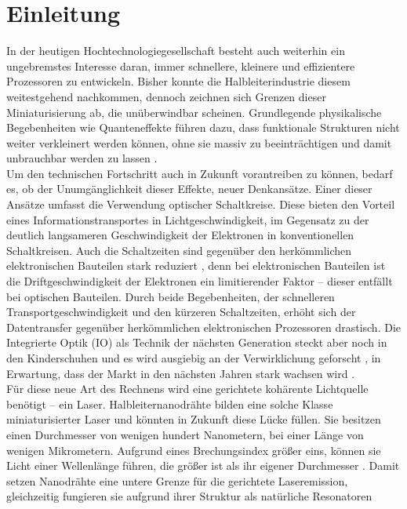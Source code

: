 \chapter{Einleitung} In der heutigen Hochtechnologiegesellschaft besteht auch
weiterhin ein \mbox{ungebremstes} Interesse daran, immer schnellere, kleinere
und effizientere Prozessoren zu \mbox{entwickeln}. Bisher konnte die
Halbleiterindustrie diesem weitestgehend nachkommen, dennoch zeichnen sich
Grenzen dieser Miniaturisierung ab, die unüberwindbar scheinen. Grundlegende
physikalische Begebenheiten wie Quanteneffekte führen dazu, dass funktionale
Strukturen nicht weiter verkleinert werden können, ohne sie massiv zu
beeinträchtigen und damit unbrauchbar werden zu lassen \cite{Moore.2017}.\\  Um
den technischen Fortschritt auch in Zukunft vorantreiben zu können, bedarf es,
ob der Unumgänglichkeit dieser Effekte, neuer Denkansätze. Einer dieser Ansätze
umfasst die Verwendung optischer Schaltkreise. Diese bieten den Vorteil eines
Informationstransportes in Lichtgeschwindigkeit, im Gegensatz zu der deutlich
langsameren \mbox{Geschwindigkeit} der Elektronen in konventionellen
Schaltkreisen. Auch die Schaltzeiten sind gegenüber den herkömmlichen
elektronischen Bauteilen stark reduziert \cite{Simonite.2010,Johnson.2015}, denn
bei elektronischen Bauteilen ist die Driftgeschwindigkeit der Elektronen ein
limitierender Faktor – dieser entfällt bei optischen Bauteilen. Durch beide
\mbox{Begebenheiten}, der schnelleren Transportgeschwindigkeit und den kürzeren
Schaltzeiten, \mbox{erhöht} sich der Datentransfer gegenüber herkömmlichen
elektronischen Prozessoren drastisch. Die Integrierte Optik (IO) als Technik der
nächsten Generation steckt aber noch in den Kinderschuhen und es wird ausgiebig
an der Verwirklichung geforscht \cite{Touch.2017}, in Erwartung, dass der Markt
in den nächsten Jahren stark wachsen wird \cite{Credence.2017}.\\ Für diese neue
Art des Rechnens wird eine gerichtete kohärente Lichtquelle benötigt – ein
Laser. Halbleiternanodrähte bilden eine solche Klasse miniaturisierter Laser und
könnten in Zukunft diese Lücke füllen. Sie besitzen einen Durchmesser von
wenigen hundert Nanometern, bei einer Länge von wenigen Mikrometern. Aufgrund
eines \mbox{Brechungsindex} größer eins, können sie Licht einer Wellenlänge
führen, die größer ist als ihr eigener Durchmesser \cite{Zimmler.2010}. Damit
setzen Nanodrähte eine untere Grenze für die gerichtete Laseremission,
gleichzeitig fungieren sie aufgrund ihrer Struktur als natürliche Resonatoren
